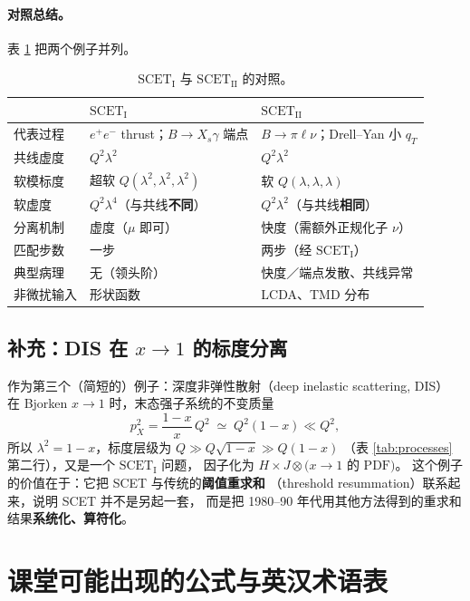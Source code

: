 \documentclass[UTF8,a4paper,11pt]{ctexart}
\theoremstyle{definition}
\theoremstyle{remark}
\theoremstyle{plain}
\newcommand{\SCETI}{\text{SCET}_{\mathrm{I}}}
\newcommand{\SCETII}{\text{SCET}_{\mathrm{II}}}
\newcommand{\en}[1]{\textsf{#1}}   %
\begin{document}
\paragraph{对照总结。}表 \ref{tab:compare} 把两个例子并列。

\begin{table}[htbp]
\centering
\caption{$\SCETI$ 与 $\SCETII$ 的对照。}
\label{tab:compare}
\begin{tabular}{@{}lll@{}}
\toprule
 & $\SCETI$ & $\SCETII$ \\
\midrule
代表过程 & $e^+e^-$ thrust；$B\to X_s\gamma$ 端点 & $B\to\pi\ell\nu$；Drell--Yan 小 $q_T$ \\
共线虚度 & $Q^2\lambda^2$ & $Q^2\lambda^2$ \\
软模标度 & 超软 $Q(\lambda^2,\lambda^2,\lambda^2)$ & 软 $Q(\lambda,\lambda,\lambda)$ \\
软虚度   & $Q^2\lambda^4$（与共线\textbf{不同}） & $Q^2\lambda^2$（与共线\textbf{相同}） \\
分离机制 & 虚度（$\mu$ 即可） & 快度（需额外正规化子 $\nu$） \\
匹配步数 & 一步 & 两步（经 $\SCETI$） \\
典型病理 & 无（领头阶） & 快度／端点发散、共线异常 \\
非微扰输入 & 形状函数 & LCDA、TMD 分布 \\
\bottomrule
\end{tabular}
\end{table}

\subsection{补充：DIS 在 $x\to1$ 的标度分离}

作为第三个（简短的）例子：深度非弹性散射（\en{deep inelastic scattering}, DIS）
在 Bjorken $x\to1$ 时，末态强子系统的不变质量
\begin{equation}
  p_X^2=\frac{1-x}{x}\,Q^2\;\simeq\;Q^2(1-x)\ll Q^2 ,
\end{equation}
所以 $\lambda^2=1-x$，标度层级为 $Q\gg Q\sqrt{1-x}\gg Q(1-x)$
（表 \ref{tab:processes} 第二行），又是一个 $\SCETI$ 问题，
因子化为 $H\times J\otimes\big(\text{$x\to1$ 的 PDF}\big)$。
这个例子的价值在于：它把 SCET 与传统的\textbf{阈值重求和}
（\en{threshold resummation}）联系起来，说明 SCET 并不是另起一套，
而是把 1980--90 年代用其他方法得到的重求和结果\textbf{系统化、算符化}。

\section{课堂可能出现的公式与英汉术语表}
\label{sec:glossary}
\end{document}
